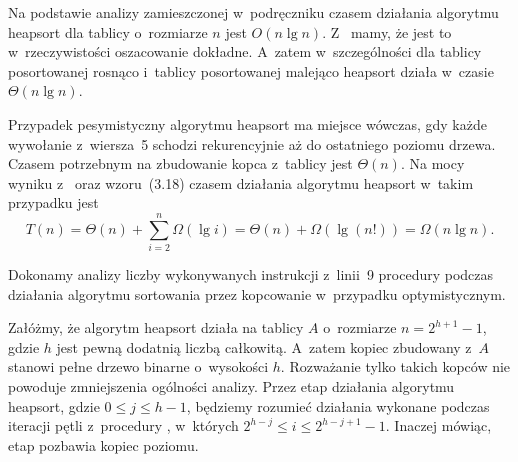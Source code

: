\exercise %
Na podstawie analizy zamieszczonej w~podręczniku czasem działania algorytmu heapsort dla tablicy o~rozmiarze $n$ jest $O(n\lg n)$. Z~ mamy, że jest to w~rzeczywistości oszacowanie dokładne. A~zatem w~szczególności dla tablicy posortowanej rosnąco i~tablicy posortowanej malejąco heapsort działa w~czasie $\Theta(n\lg n)$.

\exercise %
Przypadek pesymistyczny algorytmu heapsort ma miejsce wówczas, gdy każde wywołanie  z~wiersza~5 schodzi rekurencyjnie aż do ostatniego poziomu drzewa. Czasem potrzebnym na zbudowanie kopca z~tablicy  jest $\Theta(n)$. Na mocy wyniku z~ oraz wzoru~(3.18) czasem działania algorytmu heapsort w~takim przypadku jest
\[
	T(n) = \Theta(n)+\sum_{i=2}^{n}\Omega(\lg i) = \Theta(n)+\Omega(\lg(n!)) = \Omega(n\lg n).
\]

\exercise %
Dokonamy analizy liczby wykonywanych instrukcji z~linii~9 procedury  podczas działania algorytmu sortowania przez kopcowanie w~przypadku optymistycznym.

Załóżmy, że algorytm heapsort działa na tablicy $A$ o~rozmiarze $n=2^{h+1}-1$, gdzie $h$ jest pewną dodatnią liczbą całkowitą. A~zatem kopiec zbudowany z~$A$ stanowi pełne drzewo binarne o~wysokości $h$. Rozważanie tylko takich kopców nie powoduje zmniejszenia ogólności analizy. Przez  etap działania algorytmu heapsort, gdzie $0\le j\le h-1$, będziemy rozumieć działania wykonane podczas iteracji pętli  z~procedury , w~których $2^{h-j}\le i\le2^{h-j+1}-1$. Inaczej mówiąc,  etap pozbawia kopiec  poziomu.

